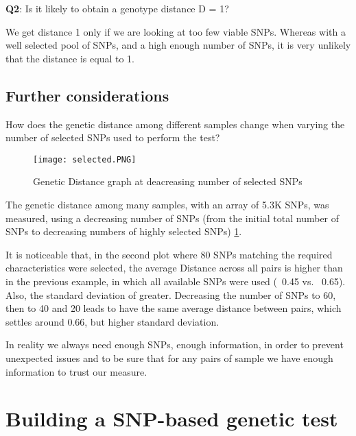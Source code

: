 \textbf{Q2}: Is it likely to obtain a genotype distance D = 1?

We get distance 1 only if we are looking at too few viable SNPs. Whereas with a well selected pool of SNPs, and a high enough number of SNPs, it is very unlikely that the distance is equal to 1.

\subsection{Further considerations}
How does the genetic distance among different samples change when varying the number of selected SNPs used to perform the test?

\begin{figure}[H]
	\texttt{[image: selected.PNG]}
	\caption{\label{fig:sel_snp}Genetic Distance graph at deacreasing number of selected SNPs}
\end{figure}

The genetic distance among many samples, with an array of 5.3K SNPs, was measured, using a decreasing number of SNPs (from the initial total number of SNPs to decreasing numbers of highly selected SNPs) \ref{fig:sel_snp}.

It is noticeable that, in the second plot where 80 SNPs matching the required characteristics were selected, the average Distance across all pairs is higher than in the previous example, in which all available SNPs were used (~0.45 vs. ~0.65). Also, the standard deviation of greater.
Decreasing the number of SNPs to 60, then to 40 and 20 leads to have the same average distance between pairs, which settles around 0.66, but higher standard deviation.

In reality we always need enough SNPs, enough information, in order to prevent unexpected issues and to be sure that for any pairs of sample we have enough information to trust our measure.


\section{Building a SNP-based genetic test}

